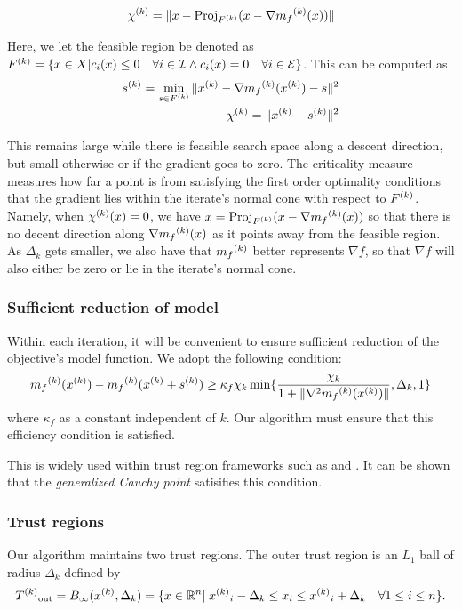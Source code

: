 \[
{\chi^{(k)}} = \|x - \text{Proj}_{{F}^{(k)}}(x - \nabla {{m}_f}^{(k)}(x))\|
\]

Here, we let the feasible region be denoted as ${F}^{(k)} = \{x \in X | c_i(x) \le 0 \quad \forall i \in \mathcal I \wedge c_i(x) = 0 \quad \forall i \in \mathcal E \}$.
This can be computed as 
\begin{align}
\label{critical}
{s}^{(k)} = \min_{s \in {F}^{(k)}} \|{x}^{(k)} - \nabla {{m}_f}^{(k)}({x}^{(k)}) - s\|^2 \\
{\chi^{(k)}} = \|{x}^{(k)} - {s}^{(k)} \|^2 \\
\end{align}

This remains large while there is feasible search space along a descent direction, but small otherwise or if the gradient goes to zero.
The criticality measure measures how far a point is from satisfying the first order optimality conditions that the gradient lies within the iterate's normal cone with respect to ${F}^{(k)}$.
Namely, when $ {\chi^{(k)}}(x) = 0$, we have $x = \text{Proj}_{{F}^{(k)}}(x - \nabla {{m}_f}^{(k)}(x))$ so that there is no decent direction along $\nabla {{m}_f}^{(k)}(x)$ as it points away from the feasible region.
As $\Delta_k$ gets smaller, we also have that ${{m}_f}^{(k)}$ better represents $\nabla f$, so that $\nabla f$ will also either be zero or lie in the iterate's normal cone.

\subsubsection{Sufficient reduction of model}

Within each iteration, it will be convenient to ensure sufficient reduction of the objective's model function.
We adopt the following condition:
\begin{equation}
\label{efficiency}
{{m}_f}^{(k)}({x}^{(k)}) - {{m}_f}^{(k)}({x}^{(k)} + {s}^{(k)}) \ge \kappa_f \chi_k \min\{ \frac{\chi_k}{1+\|\nabla^2 {{m}_f}^{(k)}({x}^{(k)})\|}, \Delta_k, 1 \}
\end{equation}
where $\kappa_f$ as a constant independent of $k$.
Our algorithm must ensure that this efficiency condition is satisfied.

This is widely used within trust region frameworks such as \cite{Conejo:2013:GCT:2620806.2621814} and \cite{Conn:2000:TM:357813}.
It can be shown that the \emph{generalized Cauchy point} satisifies this condition.


\subsubsection{Trust regions}
Our algorithm maintains two trust regions.
The outer trust region is an $L_1$ ball of radius $\Delta_k$ defined by
\begin{equation}
\label{trust_region}
{T^{(k)}}_{\text{out}} = B_{\infty}({x}^{(k)},\Delta_k) = \{x\in \mathbb R^n | \; {{x}^{(k)}}_i - \Delta_k \le x_i \le {{x}^{(k)}}_i + \Delta_k \quad \forall 1\le i \le n\}.
\end{equation}

